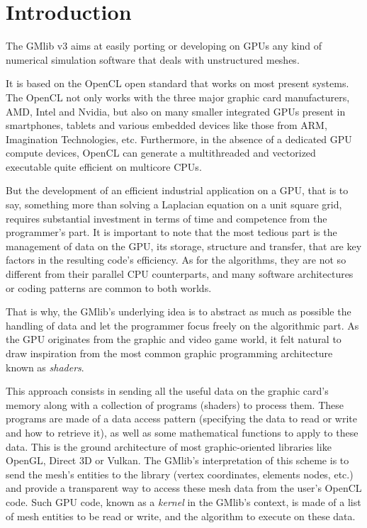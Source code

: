 \documentclass[a4paper,12pt]{article}
\begin{document}
%
%

\clearpage

\section{Introduction}
The GMlib v3 aims at easily porting or developing on GPUs any kind of numerical simulation software that deals with unstructured meshes.

It is based on the OpenCL open standard that works on most present systems. The OpenCL not only works with the three major graphic card manufacturers, AMD, Intel and Nvidia, but also on many smaller integrated GPUs present in smartphones, tablets and various embedded devices like those from ARM, Imagination Technologies, etc. Furthermore, in the absence of a dedicated GPU compute devices, OpenCL can generate a multithreaded and vectorized executable quite efficient on multicore CPUs.

But the development of an efficient industrial application on a GPU, that is to say, something more than solving a Laplacian equation on a unit square grid, requires substantial investment in terms of time and competence from the programmer's part.
It is important to note that the most tedious part is the management of data on the GPU, its storage, structure and transfer, that are key factors in the resulting code's efficiency. As for the algorithms, they are not so different from their parallel CPU counterparts, and many software architectures or coding patterns are common to both worlds.

That is why, the GMlib's underlying idea is to abstract as much as possible the handling of data and let the programmer focus freely on the algorithmic part. As the GPU originates from the graphic and video game world, it felt natural to draw inspiration from the most common graphic programming architecture known as \emph{shaders}.

This approach consists in sending all the useful data on the graphic card's memory along with a collection of programs (shaders) to process them. These programs are made of a data access pattern (specifying the data to read or write and how to retrieve it), as well as some mathematical functions to apply to these data. This is the ground architecture of most graphic-oriented libraries like OpenGL, Direct 3D or Vulkan. The GMlib's interpretation of this scheme is to send the mesh's entities to the library (vertex coordinates, elements nodes, etc.) and provide a transparent way to access these mesh data from the user's OpenCL code. Such GPU code, known as a \emph{kernel} in the GMlib's context, is made of a list of mesh entities to be read or write, and the algorithm to execute on these data.
\end{document}
